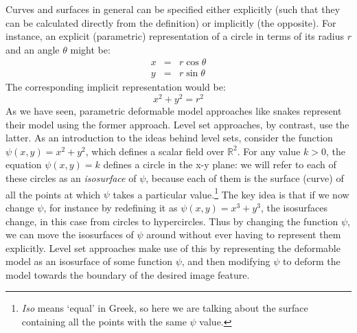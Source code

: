 Curves and surfaces in general can be specified either explicitly (such that they can be calculated directly from the definition) or implicitly (the opposite). For instance, an explicit (parametric) representation of a circle in terms of its radius $r$ and an angle $\theta$ might be:
%
\begin{eqnarray*}
x & = & r \cos \theta \\
y & = & r \sin \theta
\end{eqnarray*}
%
The corresponding implicit representation would be:
%
\[
x^2 + y^2 = r^2
\]
%
As we have seen, parametric deformable model approaches like snakes represent their model using the former approach. Level set approaches, by contrast, use the latter. As an introduction to the ideas behind level sets, consider the function $\psi(x,y) = x^2 + y^2$, which defines a scalar field over $\mathbb{R}^2$. For any value $k > 0$, the equation $\psi(x,y) = k$ defines a circle in the x-y plane: we will refer to each of these circles as an \emph{isosurface} of $\psi$, because each of them is the surface (curve) of all the points at which $\psi$ takes a particular value.\footnote{\emph{Iso} means `equal' in Greek, so here we are talking about the surface containing all the points with the same $\psi$ value.} The key idea is that if we now change $\psi$, for instance by redefining it as $\psi(x,y) = x^3 + y^3$, the isosurfaces change, in this case from circles to hypercircles. Thus by changing the function $\psi$, we can move the isosurfaces of $\psi$ around without ever having to represent them explicitly. Level set approaches make use of this by representing the deformable model as an isosurface of some function $\psi$, and then modifying $\psi$ to deform the model towards the boundary of the desired image feature.




